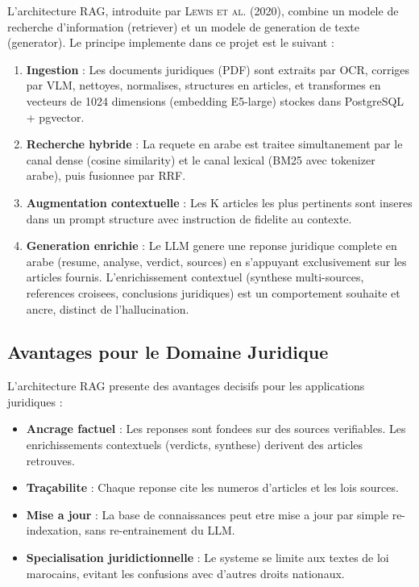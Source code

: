 L'architecture RAG, introduite par \textsc{Lewis et al.} (2020), combine un modele de recherche d'information (retriever) et un modele de generation de texte (generator). Le principe implemente dans ce projet est le suivant :

\begin{enumerate}
    \item \textbf{Ingestion} : Les documents juridiques (PDF) sont extraits par OCR, corriges par VLM, nettoyes, normalises, structures en articles, et transformes en vecteurs de 1024 dimensions (embedding E5-large) stockes dans PostgreSQL + pgvector.
    \item \textbf{Recherche hybride} : La requete en arabe est traitee simultanement par le canal dense (cosine similarity) et le canal lexical (BM25 avec tokenizer arabe), puis fusionnee par RRF.
    \item \textbf{Augmentation contextuelle} : Les K articles les plus pertinents sont inseres dans un prompt structure avec instruction de fidelite au contexte.
    \item \textbf{Generation enrichie} : Le LLM genere une reponse juridique complete en arabe (resume, analyse, verdict, sources) en s'appuyant exclusivement sur les articles fournis. L'enrichissement contextuel (synthese multi-sources, references croisees, conclusions juridiques) est un comportement souhaite et ancre, distinct de l'hallucination.
\end{enumerate}

\subsection{Avantages pour le Domaine Juridique}

L'architecture RAG presente des avantages decisifs pour les applications juridiques :

\begin{itemize}
    \item \textbf{Ancrage factuel} : Les reponses sont fondees sur des sources verifiables. Les enrichissements contextuels (verdicts, synthese) derivent des articles retrouves.
    \item \textbf{Tra\c{c}abilite} : Chaque reponse cite les numeros d'articles et les lois sources.
    \item \textbf{Mise a jour} : La base de connaissances peut etre mise a jour par simple re-indexation, sans re-entrainement du LLM.
    \item \textbf{Specialisation juridictionnelle} : Le systeme se limite aux textes de loi marocains, evitant les confusions avec d'autres droits nationaux.
\end{itemize}

